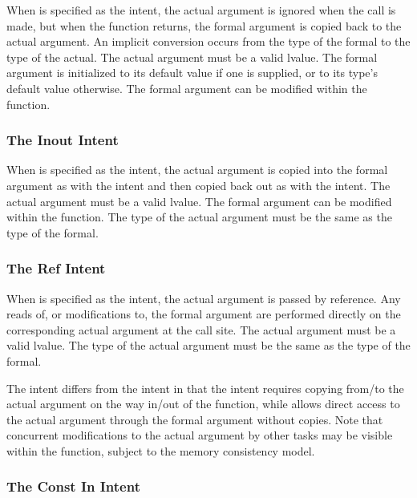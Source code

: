When  is specified as the intent, the actual argument is
ignored when the call is made, but when the function returns, the
formal argument is copied back to the actual argument.
An implicit conversion occurs from the type of the formal
to the type of the actual.  The actual argument
must be a valid lvalue.  The formal
argument is initialized to its default value if one is supplied, or to
its type's default value otherwise.  The formal argument can be
modified within the function.


\subsubsection{The Inout Intent}
\label{The_Inout_Intent}

When  is specified as the intent, the actual argument is
copied into the formal argument as with the  intent and then
copied back out as with the  intent.  The actual argument
must be a valid lvalue.  The formal argument can be modified within
the function.
The type of the actual argument must be the same
as the type of the formal.


\subsubsection{The Ref Intent}
\label{The_Ref_Intent}

When  is specified as the intent, the actual argument is
passed by reference.  Any reads of, or modifications to, the formal
argument are performed directly on the corresponding actual argument
at the call site.  The actual argument must be a valid lvalue.
The type of the actual argument must be the same
as the type of the formal.

The  intent differs from the  intent in that
the  intent requires copying from/to the actual argument on
the way in/out of the function, while  allows direct
access to the actual argument through the formal argument without
copies.  Note that concurrent modifications to the  actual argument by
other tasks may be visible within the function, subject to the memory
consistency model.


\subsubsection{The Const In Intent}
\label{The_Const_In_Intent}

